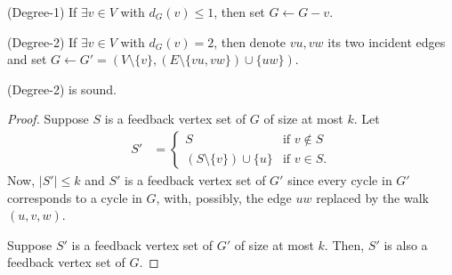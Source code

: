 \begin{frame}

 \begin{block}{(Degree-1)}
  If $\exists v\in V$ with $d_G(v)\le 1$, then set $G \leftarrow G-v$.
 \end{block}
	
\end{frame}

\begin{frame}

 \begin{block}{(Degree-2)}
  If $\exists v\in V$ with $d_G(v)=2$, then denote $vu,vw$ its two incident edges and set $G \leftarrow G'=(V\setminus \{v\},(E\setminus \{vu,vw\}) \cup \{uw\})$.
 \end{block}

 \pause
 \begin{lemma}
  (Degree-2) is sound.
 \end{lemma}
 \begin{proof}\slides{\small}
  Suppose $S$ is a feedback vertex set of $G$ of size at most $k$.
  Let
  \begin{align*}
   S' &=
    \begin{cases}
     S & \text{if } v\notin S\\
     (S \setminus \{v\}) \cup \{u\} & \text{if } v\in S.
    \end{cases}
  \end{align*}
  Now, $|S'|\le k$ and $S'$ is a feedback vertex set of $G'$ since every cycle in $G'$ corresponds to a cycle in $G$, with, possibly, the edge $uw$ replaced by the walk $(u,v,w)$.
  
  \smallskip
  Suppose $S'$ is a feedback vertex set of $G'$ of size at most $k$.
  Then, $S'$ is also a feedback vertex set of $G$.
 \end{proof}
 
\end{frame}

